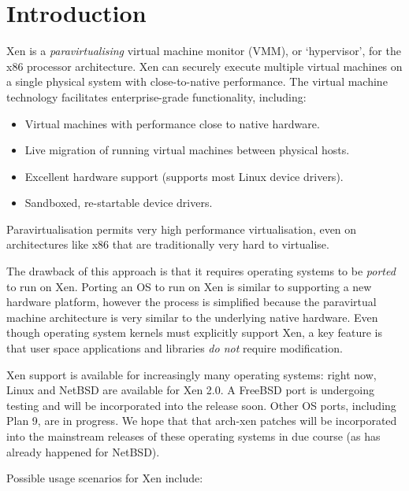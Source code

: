 \chapter{Introduction}


Xen is a \emph{paravirtualising} virtual machine monitor (VMM), or
`hypervisor', for the x86 processor architecture.  Xen can securely
execute multiple virtual machines on a single physical system with
close-to-native performance.  The virtual machine technology
facilitates enterprise-grade functionality, including:

\begin{itemize}
\item Virtual machines with performance close to native hardware.
\item Live migration of running virtual machines between physical
  hosts.
\item Excellent hardware support (supports most Linux device drivers).
\item Sandboxed, re-startable device drivers.
\end{itemize}

Paravirtualisation permits very high performance virtualisation, even
on architectures like x86 that are traditionally very hard to
virtualise.

The drawback of this approach is that it requires operating systems to
be \emph{ported} to run on Xen.  Porting an OS to run on Xen is
similar to supporting a new hardware platform, however the process is
simplified because the paravirtual machine architecture is very
similar to the underlying native hardware. Even though operating
system kernels must explicitly support Xen, a key feature is that user
space applications and libraries \emph{do not} require modification.

Xen support is available for increasingly many operating systems:
right now, Linux and NetBSD are available for Xen 2.0.
A FreeBSD port is undergoing testing and will be incorporated into the
release soon. Other OS ports, including Plan 9, are in progress.  We
hope that that arch-xen patches will be incorporated into the
mainstream releases of these operating systems in due course (as has
already happened for NetBSD).

Possible usage scenarios for Xen include:

